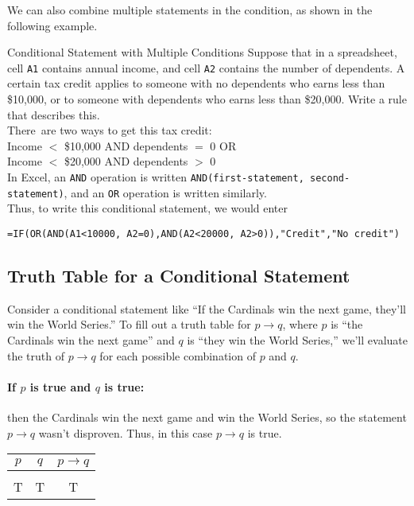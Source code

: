 We can also combine multiple statements in the condition, as shown in the following example.

\begin{example}[https://www.youtube.com/watch?v=36rk4NKhQZc]{Conditional Statement with Multiple Conditions}
Suppose that in a spreadsheet, cell \verb|A1| contains annual income, and cell \verb|A2| contains the number of dependents.  A certain tax credit applies to someone with no dependents who earns less than \$10,000, or to someone with dependents who earns less than \$20,000.  Write a rule that describes this.\\

There\sol\ are two ways to get this tax credit:\\
Income $<$ \$10,000 AND dependents $=$ 0 OR\\
Income $<$ \$20,000 AND dependents $>$ 0\\

In Excel, an \verb|AND| operation is written \verb|AND(first-statement, second-statement)|, and an \verb|OR| operation is written similarly.\\

Thus, to write this conditional statement, we would enter
\begin{center}
\verb|=IF(OR(AND(A1<10000, A2=0),AND(A2<20000, A2>0)),"Credit","No credit")|
\end{center}
\end{example}
\vfill
\pagebreak

\subsection{Truth Table for a Conditional Statement}
Consider a conditional statement like ``If the Cardinals win the next game, they'll win the World Series.''  To fill out a truth table for $p \to q$, where $p$ is ``the Cardinals win the next game'' and $q$ is ``they win the World Series,'' we'll evaluate the truth of $p \to q$ for each possible combination of $p$ and $q$.

\paragraph{If $p$ is true and $q$ is true:} then the Cardinals win the next game and win the World Series, so the statement $p \to q$ wasn't disproven.  Thus, in this case $p \to q$ is true.
\begin{center}
\begin{tabular}{c c c}
$p$ & $q$ & $p \to q$\\
\hline
& & \\
T & T & T
\end{tabular}
\end{center}

